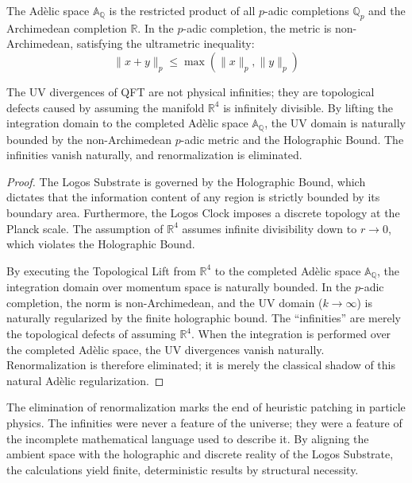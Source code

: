 \documentclass[12pt,twoside]{extbook}
\theoremstyle{definition}
\theoremstyle{remark}
\begin{document}
The Adèlic space $\mathbb{A}_\mathbb{Q}$ is the restricted product of all $p$-adic completions $\mathbb{Q}_p$ and the Archimedean completion $\mathbb{R}$. In the $p$-adic completion, the metric is non-Archimedean, satisfying the ultrametric inequality:
\begin{equation}
\|x + y\|_p \leq \max(\|x\|_p, \|y\|_p)
\end{equation}

\begin{theorem}
The UV divergences of QFT are not physical infinities; they are topological defects caused by assuming the manifold $\mathbb{R}^4$ is infinitely divisible. By lifting the integration domain to the completed Adèlic space $\mathbb{A}_\mathbb{Q}$, the UV domain is naturally bounded by the non-Archimedean $p$-adic metric and the Holographic Bound. The infinities vanish naturally, and renormalization is eliminated.
\end{theorem}

\begin{proof}
The Logos Substrate is governed by the Holographic Bound, which dictates that the information content of any region is strictly bounded by its boundary area. Furthermore, the Logos Clock imposes a discrete topology at the Planck scale. The assumption of $\mathbb{R}^4$ assumes infinite divisibility down to $r \to 0$, which violates the Holographic Bound.

By executing the Topological Lift from $\mathbb{R}^4$ to the completed Adèlic space $\mathbb{A}_\mathbb{Q}$, the integration domain over momentum space is naturally bounded. In the $p$-adic completion, the norm is non-Archimedean, and the UV domain ($k \to \infty$) is naturally regularized by the finite holographic bound. The ``infinities'' are merely the topological defects of assuming $\mathbb{R}^4$. When the integration is performed over the completed Adèlic space, the UV divergences vanish naturally. Renormalization is therefore eliminated; it is merely the classical shadow of this natural Adèlic regularization.
\end{proof}

The elimination of renormalization marks the end of heuristic patching in particle physics. The infinities were never a feature of the universe; they were a feature of the incomplete mathematical language used to describe it. By aligning the ambient space with the holographic and discrete reality of the Logos Substrate, the calculations yield finite, deterministic results by structural necessity.
\end{document}
